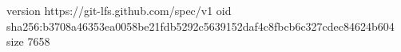 version https://git-lfs.github.com/spec/v1
oid sha256:b3708a46353ea0058be21fdb5292c5639152daf4c8fbcb6c327cdec84624b604
size 7658
